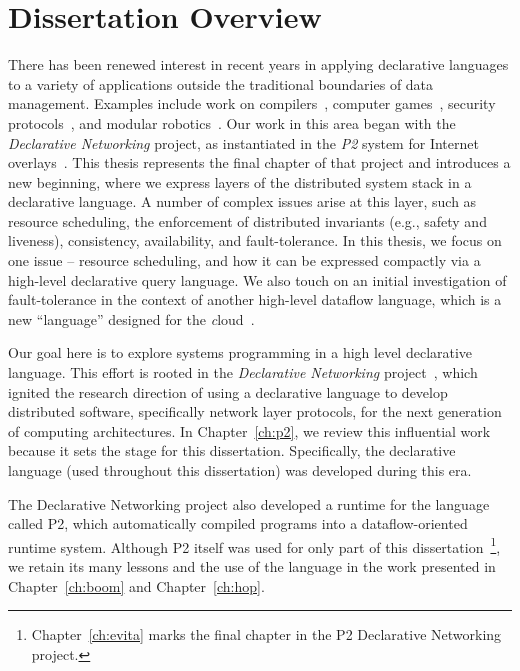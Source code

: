 \chapter[Dissertation Overview]{Dissertation Overview}
\label{ch:overview}

There has been renewed interest in recent years in applying declarative
languages to a variety of applications outside the traditional boundaries of
data management.  Examples include work on compilers~\cite{lam05context},
computer games~\cite{white-sigmod07}, security protocols~\cite{li-padl03}, and
modular robotics~\cite{ashley-iros07}.  Our work in this area began with the
{\em Declarative Networking} project, as instantiated in the {\em P2} system
for Internet overlays~\cite{p2:sosp, loo-sigmod06}.  This thesis represents the
final chapter of that project and introduces a new beginning, where we express
layers of the distributed system stack in a declarative language.  A number
of complex issues arise at this layer, such as resource scheduling, the
enforcement of distributed invariants (e.g., safety and liveness), consistency,
availability, and fault-tolerance.  In this thesis, we focus on one issue --
resource scheduling, and how it can be expressed compactly via a high-level
declarative query language.  We also touch on an initial investigation of
fault-tolerance in the context of another high-level dataflow language, which
is a new ``language'' designed for the {\emph cloud}~\cite{abovetheclouds}.

Our goal here is to explore systems programming in a high level declarative
language.  This effort is rooted in the {\em Declarative Networking}
project~\cite{boon-thesis}, which ignited the research direction of using a
declarative language to develop distributed software, specifically network
layer protocols, for the next generation of computing architectures.  In
Chapter~\ref{ch:p2}, we review this influential work because it sets the stage
for this dissertation.  Specifically, the declarative language \OVERLOG (used
throughout this dissertation) was developed during this era.  

The Declarative Networking project also developed a runtime for the \OVERLOG
language called P2, which automatically compiled \OVERLOG programs into a
dataflow-oriented runtime system.  Although P2 itself was used for only part of
this dissertation~\footnote{Chapter~\ref{ch:evita} marks the final chapter in
the P2 Declarative Networking project.}, we retain its many lessons and the use
of the \OVERLOG language in the work presented in Chapter~\ref{ch:boom} and
Chapter~\ref{ch:hop}.

